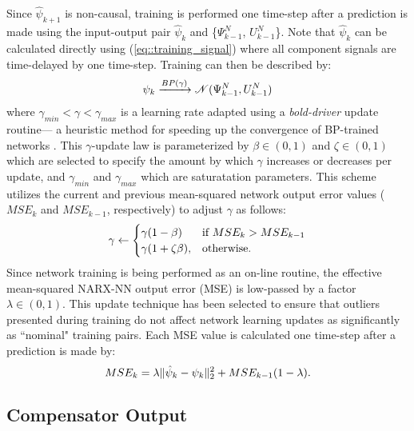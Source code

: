\vspace{-4mm}
Since $\hat{\psi}_{k+1}$ is non-causal, training is performed one time-step after a prediction is made using the input-output pair $\hat{\psi}_{k}$ and \{${\Psi}_{k-1}^{N}$, ${U}_{k-1}^{N}$\}. Note that $\hat{\psi}_{k}$ can be calculated directly using (\ref{eq::training_signal}) where all component signals are time-delayed by one time-step. Training can then be described by:
	\begin{equation}
		\vspace{-1mm}
		\psi_{k} \xrightarrow{BP(\gamma)} \mathscr{N}({\Psi}_{k-1}^{N},{U}_{k-1}^{N})
		\label{eq::training}
	\end{equation}
where $\gamma _{min} < \gamma < \gamma _{max}$ is a learning rate adapted using a \emph{bold-driver} update routine--- a heuristic method for speeding up the convergence of BP-trained networks \cite{Battiti1992,Magoulas1999}. This $\gamma$-update law is parameterized by $\beta \in (0,1)$ and $\zeta \in (0,1)$ which are selected to specify the amount by which $\gamma$ increases or decreases per update, and $\gamma _{min}$ and $\gamma _{max}$ which are saturatation parameters. This scheme utilizes the current and previous mean-squared network output error values ($MSE_{k}$ and $MSE_{k-1}$, respectively) to adjust $\gamma$ as follows:
	\begin{equation}
		\vspace{-1mm}
	    \gamma \leftarrow 
		\begin{cases}
	    \gamma (1- \beta) 		& \text{if } MSE_{k} > MSE_{k-1}\\
	    \gamma (1+\zeta \beta),& \text{otherwise}.
		\end{cases}
	\end{equation}
Since network training is being performed as an on-line routine, the effective mean-squared NARX-NN  output error (MSE) is low-passed by a factor $\lambda \in \left(0,1\right)$. This update technique has been selected to ensure that outliers presented during training do not affect network learning updates as significantly as ``nominal" training pairs. Each \kth \hspace{0.25mm} MSE value is calculated one time-step after a prediction is made by:
	\begin{equation}
		\vspace{-1mm}
		MSE_{k} = \lambda \|\hat{\psi}_{k} - \psi_{k}\|_{2}^{2} + MSE_{k-1}(1-\lambda).
	\end{equation}


\subsection{Compensator Output}

